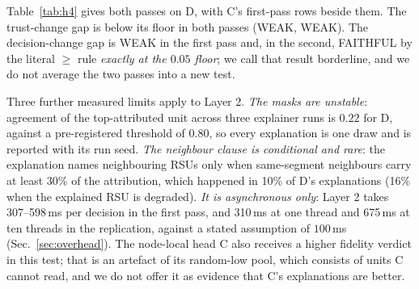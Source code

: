 Table~\ref{tab:h4} gives both passes on D, with C's first-pass rows beside them.
The trust-change gap is below its floor in both passes (WEAK, WEAK).
The decision-change gap is WEAK in the first pass and, in the second, FAITHFUL by the literal $\ge$ rule \emph{exactly at the $0.05$ floor}; we call that result borderline, and we do not average the two passes into a new test.

Three further measured limits apply to Layer 2.
\emph{The masks are unstable}: agreement of the top-attributed unit across three explainer runs is $0.22$ for D, against a pre-registered threshold of $0.80$, so every explanation is one draw and is reported with its run seed.
\emph{The neighbour clause is conditional and rare}: the explanation names neighbouring RSUs only when same-segment neighbours carry at least $30\%$ of the attribution, which happened in 10\% of D's explanations (16\% when the explained RSU is degraded).
\emph{It is asynchronous only}: Layer 2 takes 307--598\,ms per decision in the first pass, and 310\,ms at one thread and 675\,ms at ten threads in the replication, against a stated assumption of $100$\,ms (Sec.~\ref{sec:overhead}).
The node-local head C also receives a higher fidelity verdict in this test; that is an artefact of its random-low pool, which consists of units C cannot read, and we do not offer it as evidence that C's explanations are better.
